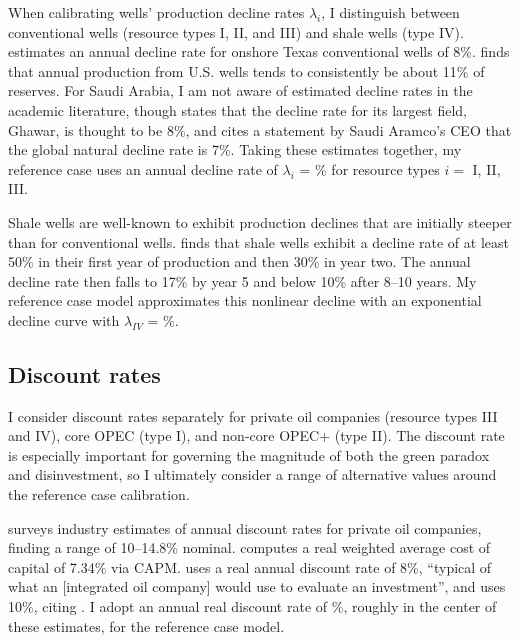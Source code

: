 \documentclass[12pt]{article}
\begin{document}
When calibrating wells' production decline rates $\lambda_i$, I distinguish between conventional wells (resource types I, II, and III) and shale wells (type IV). \cite{aks2018} estimates an annual decline rate for onshore Texas conventional wells of 8\%. \cite{thompson2001} finds that annual production from U.S. wells tends to consistently be about 11\% of reserves. For Saudi Arabia, I am not aware of estimated decline rates in the academic literature, though 
\cite{forbes_decline_2019} states that the decline rate for its largest field, Ghawar, is thought to be 8\%, and \cite{spglobal_decline_2022} cites a statement by Saudi Aramco's CEO that the global natural decline rate is 7\%. Taking these estimates together, my reference case uses an annual decline rate of $\lambda_i$ = \unskip\% for resource types $i=$ I, II, III.

Shale wells are well-known to exhibit production declines that are initially steeper than for conventional wells. \cite{jpt_decline_2020} finds that shale wells exhibit a decline rate of at least 50\% in their first year of production and then 30\% in year two. The annual decline rate then falls to 17\% by year 5 and below 10\% after 8--10 years.  My reference case model approximates this nonlinear decline with an exponential decline curve with $\lambda_{IV}$ = \unskip\%.


\subsection{Discount rates} \label{sec:cal_disc}

I consider discount rates separately for private oil companies (resource types III and IV), core OPEC (type I), and non-core OPEC+ (type II). The discount rate is especially important for governing the magnitude of both the green paradox and disinvestment, so I ultimately consider a range of alternative values around the reference case calibration.

\cite{nrgi2021} surveys industry estimates of annual discount rates for private oil companies, finding a range of 10--14.8\% nominal. \cite{damodaron2024} computes a real weighted average cost of capital of 7.34\% via CAPM. \cite{cairnssmith2019} uses a real annual discount rate of 8\%, ``typical of what an [integrated oil company] would use to evaluate an investment'', and \cite{aks2018} uses 10\%, citing \cite{SPEE_1995}. I adopt an annual real discount rate of \unskip\%, roughly in the center of these estimates, for the reference case model.
\end{document}
